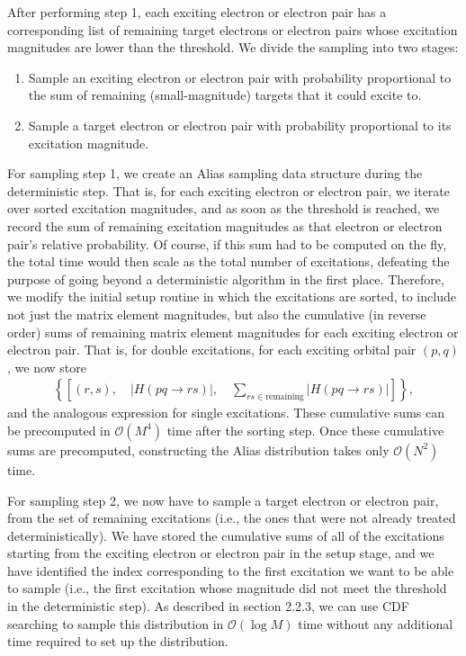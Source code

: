 \documentclass[english]{article}
\begin{document}
After performing step 1, each exciting electron or electron pair has a corresponding list of remaining target electrons or electron pairs whose excitation magnitudes are lower than the threshold. We divide the sampling into two stages:
\begin{enumerate}
	\item Sample an exciting electron or electron pair with probability proportional to the sum of remaining (small-magnitude) targets that it could excite to.
	\item Sample a target electron or electron pair with probability proportional to its excitation magnitude.
\end{enumerate}

For sampling step 1, we create an Alias sampling data structure during the deterministic step. That is, for each exciting electron or electron pair, we iterate over sorted excitation magnitudes, and as soon as the threshold is reached, we record the sum of remaining excitation magnitudes as that electron or electron pair's relative probability. Of course, if this sum had to be computed on the fly, the total time would then scale as the total number of excitations, defeating the purpose of going beyond a deterministic algorithm in the first place. Therefore, we modify the initial setup routine in which the excitations are sorted, to include not just the matrix element magnitudes, but also the cumulative (in reverse order) sums of remaining matrix element magnitudes for each exciting electron or electron pair. That is, for double excitations, for each exciting orbital pair $(p,q)$, we now store
\begin{eqnarray}
	\left\{\left[(r,s), \quad |H(pq\rightarrow rs)|, \quad \sum_{rs\in\textrm{remaining}}|H(pq\rightarrow rs)|\right]\right\},
\end{eqnarray}
and the analogous expression for single excitations. These cumulative sums can be precomputed in $\mathcal{O}(M^4)$ time after the sorting step. Once these cumulative sums are precomputed, constructing the Alias distribution takes only $\mathcal{O}(N^2)$ time.

For sampling step 2, we now have to sample a target electron or electron pair, from the set of remaining excitations (i.e., the ones that were not already treated deterministically). We have stored the cumulative sums of all of the excitations starting from the exciting electron or electron pair in the setup stage, and we have identified the index corresponding to the first excitation we want to be able to sample (i.e., the first excitation whose magnitude did not meet the threshold in the deterministic step). As described in section 2.2.3, we can use CDF searching to sample this distribution in $\mathcal{O}(\log M)$ time without any additional time required to set up the distribution.
\end{document}
